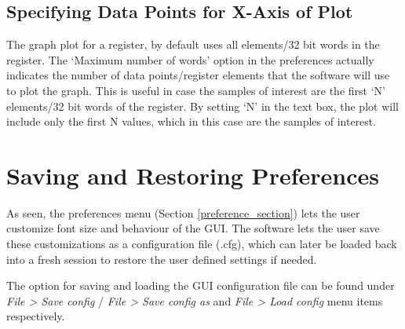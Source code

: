 \subsection{Specifying Data Points for X-Axis of Plot}\label{subsub::graph_x_axis}
The graph plot for a register, by default uses all elements/32 bit words in the register. The 	`Maximum number of words' option in the preferences actually indicates the number of data points/register elements that the software will use to plot the graph. This is useful in case the samples of interest are the first `N' elements/32 bit words of the register. By setting `N' in the text box, the plot will include only the first N values, which in this case are the samples of interest.
		
\section{Saving and Restoring Preferences}
As seen, the preferences menu (Section \ref{preference_section}) lets the user customize font size and behaviour of the GUI. The software lets the user save these customizations as a configuration file (.cfg), which can later be loaded back into a fresh session to restore the user defined settings if needed.

The option for saving and loading the GUI configuration file can be found under \textit{File > Save config} / \textit{File > Save config as} and \textit{File > Load config }menu items respectively.

%
%


%
%
%
%
%




